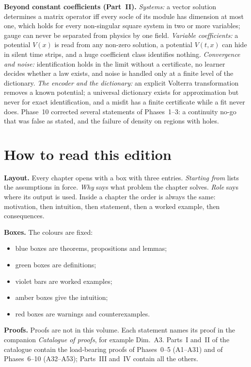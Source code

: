 \textbf{Beyond constant coefficients (Part~II).} \emph{Systems:} a vector solution determines a matrix operator iff every socle of its module has dimension at most one, which holds for every non-singular square system in two or more variables; gauge can never be separated from physics by one field. \emph{Variable coefficients:} a potential $V(x)$ is read from any non-zero solution, a potential $V(t,x)$ can hide in silent time strips, and a huge coefficient class identifies nothing. \emph{Convergence and noise:} identification holds in the limit without a certificate, no learner decides whether a law exists, and noise is handled only at a finite level of the dictionary. \emph{The encoder and the dictionary:} an explicit Volterra transformation removes a known potential; a universal dictionary exists for approximation but never for exact identification, and a misfit has a finite certificate while a fit never does. Phase~10 corrected several statements of Phases~1--3: a continuity no-go that was false as stated, and the failure of density on regions with holes.

\section*{How to read this edition}

\textbf{Layout.} Every chapter opens with a box with three entries. \emph{Starting from} lists the assumptions in force. \emph{Why} says what problem the chapter solves. \emph{Role} says where its output is used. Inside a chapter the order is always the same: motivation, then intuition, then statement, then a worked example, then consequences.

\textbf{Boxes.} The colours are fixed:
\begin{itemize}
\item blue boxes are theorems, propositions and lemmas;
\item green boxes are definitions;
\item violet bars are worked examples;
\item amber boxes give the intuition;
\item red boxes are warnings and counterexamples.
\end{itemize}

\textbf{Proofs.} Proofs are not in this volume. Each statement names its proof in the companion \emph{Catalogue of proofs}, for example \textsf{\footnotesize\color{cA}Dim.~A3}. Parts~I and~II of the catalogue contain the load-bearing proofs of Phases~0--5 (A1--A31) and of Phases~6--10 (A32--A53); Parts~III and~IV contain all the others.

